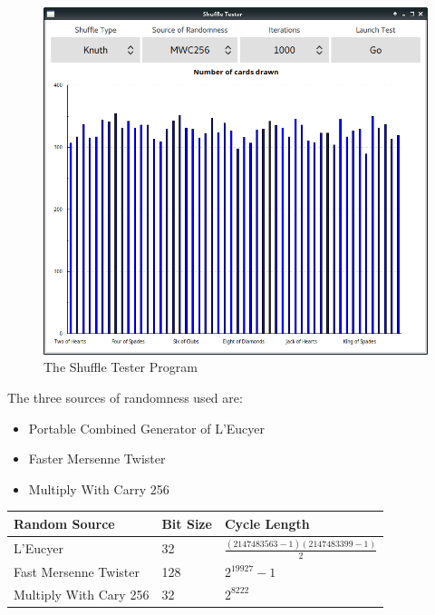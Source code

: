 \begin{figure}[H]
    \centering
    \includegraphics[width=0.8\linewidth]{../images/shuffletester.png}
    \caption{The Shuffle Tester Program}%
    \label{fig:shuffletester}
\end{figure}

The three sources of randomness used are:

\begin{itemize}
    \item Portable Combined Generator of L'Eucyer \parencite{leucyer1988}
    \item Faster Mersenne Twister \parencite{matsumoto1998,saito2008}
    \item Multiply With Carry 256 \parencite{marsaglia2003}
\end{itemize}

\begin{center}
    \begin{tabular}{l l l}
    \toprule
    Random Source           & Bit Size  & Cycle Length  \\
    \midrule
    L'Eucyer                & 32        & $ \displaystyle \frac{(2147483563-1)(2147483399-1)}{2}$   \\ \addlinespace
    Fast Mersenne Twister   & 128       & $ \displaystyle {2}^{19927}-1$                            \\ \addlinespace
    Multiply With Cary 256  & 32        & $ \displaystyle {2}^{8222}$                               \\
    \bottomrule
    \end{tabular}
\end{center}

